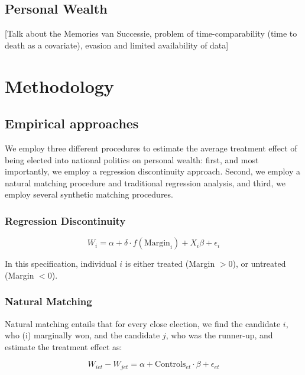 \documentclass[12pt]{article}
\begin{document}
\subsection{Personal Wealth}

    [Talk about the Memories van Successie, problem of time-comparability (time to death as a covariate), evasion and limited availability of data]


\section{Methodology}

\subsection{Empirical approaches}

    We employ three different procedures to estimate the average treatment effect of being elected into national politics on personal wealth: first, and most importantly, we employ a regression discontinuity approach. Second, we employ a natural matching procedure and traditional regression analysis, and third, we employ several synthetic matching procedures. 
    
    \subsubsection{Regression Discontinuity}
    
    
    \begin{equation}
        W_{i} = \alpha + \delta \cdot f(\text{Margin}_i) + X_i \beta + \epsilon_i
    \end{equation}

    In this specification, individual $i$ is either treated (Margin $> 0$), or untreated (Margin $< 0$). 
    
    \subsubsection{Natural Matching}
    
    Natural matching entails that for every close election, we find the candidate $i$, who (i) marginally won, and the candidate $j$, who was the runner-up, and estimate the treatment effect as:

    \begin{equation}
        W_{iet} - W_{jet} = \alpha + \text{Controls}_{et} \cdot \beta + \epsilon_{et}
    \end{equation}
\end{document}

